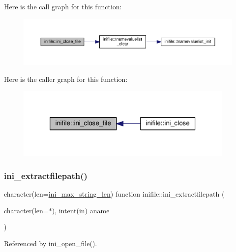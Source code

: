 Here is the call graph for this function\+:
\nopagebreak
\begin{figure}[H]
\begin{center}
\leavevmode
\includegraphics[width=350pt]{namespaceinifile_a3e8c87d124e33f36146deccd416a2cc1_cgraph}
\end{center}
\end{figure}
Here is the caller graph for this function\+:
\nopagebreak
\begin{figure}[H]
\begin{center}
\leavevmode
\includegraphics[width=302pt]{namespaceinifile_a3e8c87d124e33f36146deccd416a2cc1_icgraph}
\end{center}
\end{figure}
\mbox{\label{namespaceinifile_a363a92da96b45fce841b0f4dfb2f3fd9}} 
\subsubsection{\texorpdfstring{ini\+\_\+extractfilepath()}{ini\_extractfilepath()}}
{\footnotesize\ttfamily character(len=\mbox{\hyperlink{namespaceinifile_a32faebf83b580d14b5af965dcb4eebfd}{ini\+\_\+max\+\_\+string\+\_\+len}}) function inifile\+::ini\+\_\+extractfilepath (\begin{DoxyParamCaption}\item[{character(len=$\ast$), intent(in)}]{aname }\end{DoxyParamCaption})}



Referenced by ini\+\_\+open\+\_\+file().

